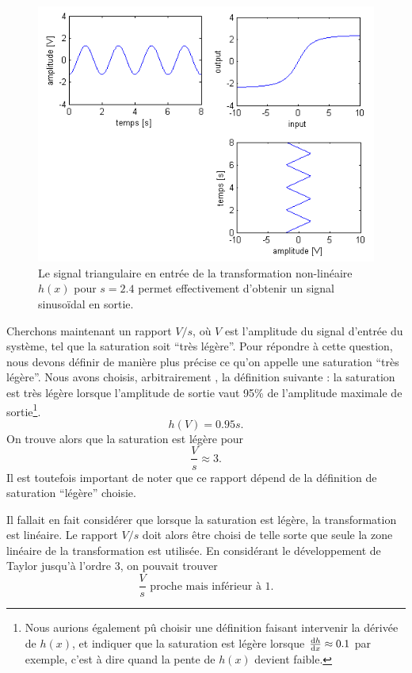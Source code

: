 \begin{figure}[ht]
	\centering
	\includegraphics[scale=0.6]{img/in_out_diagram.png}
	\caption{Le signal triangulaire en entrée de la transformation
	non-linéaire $h(x)$ pour $s=2.4$ permet effectivement d'obtenir
	un signal sinusoïdal en sortie.}
	\label{fig:in_out_diagram}
\end{figure}

Cherchons maintenant un rapport $V/s$, où $V$ est
l'amplitude du signal d'entrée du système, tel que
la saturation soit ``très légère''. Pour répondre à cette question,
nous devons définir de manière plus précise ce qu'on appelle
une saturation ``très légère''. Nous avons choisis, arbitrairement
, la définition suivante : la saturation est très légère
lorsque l'amplitude de sortie vaut 95\% de l'amplitude
maximale de sortie\footnote{Nous aurions également pû choisir une définition
faisant intervenir la dérivée de $h(x)$, et indiquer que la
saturation est légère lorsque $\frac{\operatorname{d}\! h}{\operatorname{d}\! x} \approx 0.1$ par exemple,
c'est à dire quand la pente de $h(x)$ devient faible.}.
\[ h(V) = 0.95s. \]
On trouve alors que la saturation est légère pour 
\[ \frac{V}{s} \approx 3. \]
Il est toutefois important de noter que ce rapport
dépend de la définition de saturation ``légère'' choisie.

\begin{correction}
	Il fallait en fait considérer que lorsque la saturation
	est légère, la transformation est linéaire. Le rapport
	$V/s$ doit alors être choisi de telle sorte que seule la
	zone linéaire de la transformation est utilisée. En considérant
	le développement de Taylor jusqu'à l'ordre 3, on pouvait
	trouver 
	\[ \frac{V}{s} \text{ proche mais inférieur à } 1.\]
\end{correction}

